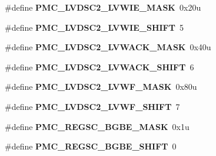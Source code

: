 \begin{DoxyCompactItemize}
\item 
\#define {\bfseries P\+M\+C\+\_\+\+L\+V\+D\+S\+C2\+\_\+\+L\+V\+W\+I\+E\+\_\+\+M\+A\+SK}~0x20u\hypertarget{group__PMC__Register__Masks_ga3a9de69524d99d6ec8985d211bc7861d}{}\label{group__PMC__Register__Masks_ga3a9de69524d99d6ec8985d211bc7861d}

\item 
\#define {\bfseries P\+M\+C\+\_\+\+L\+V\+D\+S\+C2\+\_\+\+L\+V\+W\+I\+E\+\_\+\+S\+H\+I\+FT}~5\hypertarget{group__PMC__Register__Masks_gaf5cb9cf53bade8254aa7749b5eb36eff}{}\label{group__PMC__Register__Masks_gaf5cb9cf53bade8254aa7749b5eb36eff}

\item 
\#define {\bfseries P\+M\+C\+\_\+\+L\+V\+D\+S\+C2\+\_\+\+L\+V\+W\+A\+C\+K\+\_\+\+M\+A\+SK}~0x40u\hypertarget{group__PMC__Register__Masks_ga8b0c8bcad4d38e6ff797e9bc3d9db6d7}{}\label{group__PMC__Register__Masks_ga8b0c8bcad4d38e6ff797e9bc3d9db6d7}

\item 
\#define {\bfseries P\+M\+C\+\_\+\+L\+V\+D\+S\+C2\+\_\+\+L\+V\+W\+A\+C\+K\+\_\+\+S\+H\+I\+FT}~6\hypertarget{group__PMC__Register__Masks_ga99ad1d373a7be7591a7ee3577bed5374}{}\label{group__PMC__Register__Masks_ga99ad1d373a7be7591a7ee3577bed5374}

\item 
\#define {\bfseries P\+M\+C\+\_\+\+L\+V\+D\+S\+C2\+\_\+\+L\+V\+W\+F\+\_\+\+M\+A\+SK}~0x80u\hypertarget{group__PMC__Register__Masks_ga34187b0598a3e166a457818770a616d4}{}\label{group__PMC__Register__Masks_ga34187b0598a3e166a457818770a616d4}

\item 
\#define {\bfseries P\+M\+C\+\_\+\+L\+V\+D\+S\+C2\+\_\+\+L\+V\+W\+F\+\_\+\+S\+H\+I\+FT}~7\hypertarget{group__PMC__Register__Masks_ga8bcfb9fc5fd4a92164b2aa6cdb6db77e}{}\label{group__PMC__Register__Masks_ga8bcfb9fc5fd4a92164b2aa6cdb6db77e}

\item 
\#define {\bfseries P\+M\+C\+\_\+\+R\+E\+G\+S\+C\+\_\+\+B\+G\+B\+E\+\_\+\+M\+A\+SK}~0x1u\hypertarget{group__PMC__Register__Masks_ga98cf5c98c133e20fb620faa6ca29d98e}{}\label{group__PMC__Register__Masks_ga98cf5c98c133e20fb620faa6ca29d98e}

\item 
\#define {\bfseries P\+M\+C\+\_\+\+R\+E\+G\+S\+C\+\_\+\+B\+G\+B\+E\+\_\+\+S\+H\+I\+FT}~0\hypertarget{group__PMC__Register__Masks_ga2e23aa8155158c86fc53ccd8baccf24d}{}\label{group__PMC__Register__Masks_ga2e23aa8155158c86fc53ccd8baccf24d}


\end{DoxyCompactItemize}
